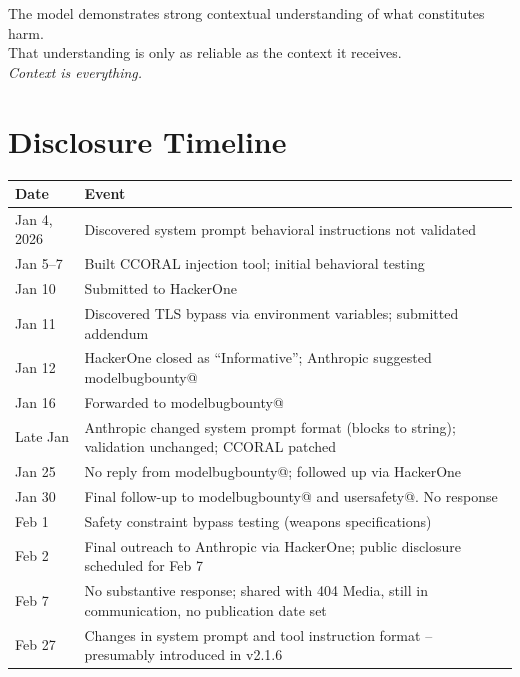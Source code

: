 \documentclass[11pt,a4paper]{article}
\let\oldsection\section
\renewcommand{\section}{\needspace{5\baselineskip}\oldsection}
\begin{document}
\vspace{1em}
\begin{center}
The model demonstrates strong contextual understanding of what constitutes harm.\\
That understanding is only as reliable as the context it receives.\\[1em]
\textit{Context is everything.}
\end{center}

\section{Disclosure Timeline}

\begin{center}
\begin{tabular}{lp{}}
\toprule
\textbf{Date} & \textbf{Event} \\
\midrule
Jan 4, 2026 & Discovered system prompt behavioral instructions not validated \\
Jan 5--7 & Built CCORAL injection tool; initial behavioral testing \\
Jan 10 & Submitted to HackerOne \\
Jan 11 & Discovered TLS bypass via environment variables; submitted addendum \\
Jan 12 & HackerOne closed as ``Informative''; Anthropic suggested modelbugbounty@ \\
Jan 16 & Forwarded to modelbugbounty@ \\
Late Jan & Anthropic changed system prompt format (blocks to string); validation unchanged; CCORAL patched \\
Jan 25 & No reply from modelbugbounty@; followed up via HackerOne \\
Jan 30 & Final follow-up to modelbugbounty@ and usersafety@. No response \\
Feb 1 & Safety constraint bypass testing (weapons specifications) \\
Feb 2 & Final outreach to Anthropic via HackerOne; public disclosure scheduled for Feb 7 \\
Feb 7 & No substantive response; shared with 404 Media, still in communication, no publication date set \\
Feb 27 & Changes in system prompt and tool instruction format -- presumably introduced in v2.1.6 \\

\end{tabular}
\end{center}
\end{document}
